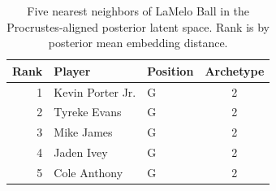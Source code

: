 \begin{table}[htbp]
  \centering\small
  \begin{tabular}{rllc}
    \toprule
    Rank & Player & Position & Archetype \\
    \midrule
    1 & Kevin Porter Jr. & G & 2 \\
    2 & Tyreke Evans & G & 2 \\
    3 & Mike James & G & 2 \\
    4 & Jaden Ivey & G & 2 \\
    5 & Cole Anthony & G & 2 \\
    \bottomrule
  \end{tabular}
  \caption{Five nearest neighbors of LaMelo Ball in the Procrustes-aligned posterior latent space. Rank is by posterior mean embedding distance.}
  \label{tab:LaMelo_Ball_neighbors}
\end{table}


